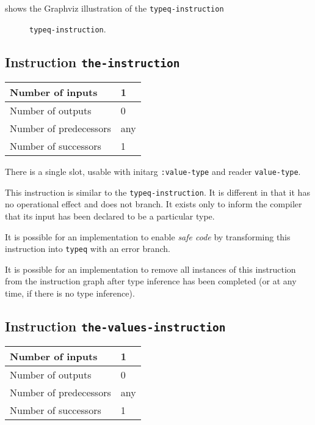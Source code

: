  shows the Graphviz illustration of the
\texttt{typeq-instruction}

\begin{figure}
\begin{center}
\end{center}
\caption{\label{fig-typeq-instruction}
\texttt{typeq-instruction}.}
\end{figure}

\subsection{Instruction \texttt{the-instruction}}
\label{mir-instruction-the}

\begin{tabular}{|l|l|}
  \hline
  Number of inputs & 1\\
  \hline
  Number of outputs & 0\\
  \hline
  Number of predecessors & any\\
  \hline
  Number of successors & 1\\
  \hline
\end{tabular}

There is a single slot, usable with initarg \texttt{:value-type} and
reader \texttt{value-type}.

This instruction is similar to the \texttt{typeq-instruction}. It is
different in that it has no operational effect and does not branch.
It exists only to inform the compiler that its input has been declared
to be a particular type.

It is possible for an implementation to enable \emph{safe code} by
transforming this instruction into \texttt{typeq} with an error
branch.

It is possible for an implementation to remove all instances of this
instruction from the instruction graph after type inference has been
completed (or at any time, if there is no type inference).

\subsection{Instruction \texttt{the-values-instruction}}
\label{mir-instruction-the-values}
\begin{tabular}{|l|l|}
  \hline
  Number of inputs & 1\\
  \hline
  Number of outputs & 0\\
  \hline
  Number of predecessors & any\\
  \hline
  Number of successors & 1\\
  \hline
\end{tabular}

